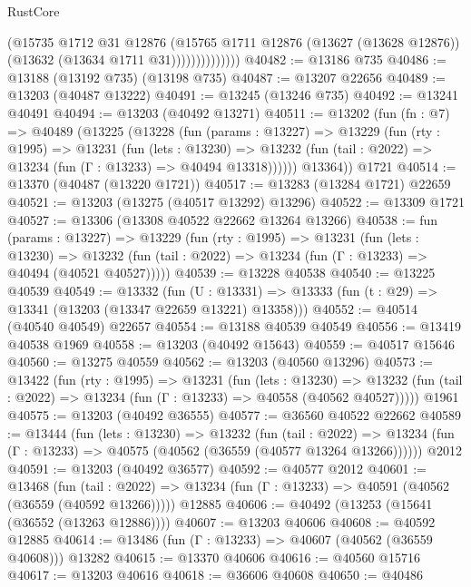 \begin{lexlean}{RustCore}
\begin{coremodule}
                        (@15735
                          @1712
                          @31
                          @12876
                          (@15765
                            @1711
                            @12876
                            (@13627 (@13628 @12876))
                            (@13632 (@13634 @1711 @31))))))))))))))
@40482 := @13186 @735
@40486 := @13188 (@13192 @735) (@13198 @735)
@40487 := @13207 @22656
@40489 := @13203 (@40487 @13222)
@40491 := @13245 (@13246 @735)
@40492 := @13241 @40491
@40494 := @13203 (@40492 @13271)
@40511 := @13202
    (fun (fn : @7) =>
    @40489
      (@13225
        (@13228
          (fun (params : @13227) =>
          @13229
            (fun (rty : @1995) =>
            @13231
              (fun (lets : @13230) =>
              @13232 (fun (tail : @2022) => @13234 (fun (Γ : @13233) => @40494 @13318))))))
        @13364))
    @1721
@40514 := @13370 (@40487 (@13220 @1721))
@40517 := @13283 (@13284 @1721) @22659
@40521 := @13203 (@13275 (@40517 @13292) @13296)
@40522 := @13309 @1721
@40527 := @13306 (@13308 @40522 @22662 @13264 @13266)
@40538 := fun (params : @13227) =>
  @13229
    (fun (rty : @1995) =>
    @13231
      (fun (lets : @13230) =>
      @13232 (fun (tail : @2022) => @13234 (fun (Γ : @13233) => @40494 (@40521 @40527)))))
@40539 := @13228 @40538
@40540 := @13225 @40539
@40549 := @13332
    (fun (U : @13331) => @13333 (fun (t : @29) => @13341 (@13203 (@13347 @22659 @13221) @13358)))
@40552 := @40514 (@40540 @40549) @22657
@40554 := @13188 @40539 @40549
@40556 := @13419 @40538 @1969
@40558 := @13203 (@40492 @15643)
@40559 := @40517 @15646
@40560 := @13275 @40559
@40562 := @13203 (@40560 @13296)
@40573 := @13422
    (fun (rty : @1995) =>
    @13231
      (fun (lets : @13230) =>
      @13232 (fun (tail : @2022) => @13234 (fun (Γ : @13233) => @40558 (@40562 @40527)))))
    @1961
@40575 := @13203 (@40492 @36555)
@40577 := @36560 @40522 @22662
@40589 := @13444
    (fun (lets : @13230) =>
    @13232
      (fun (tail : @2022) =>
      @13234 (fun (Γ : @13233) => @40575 (@40562 (@36559 (@40577 @13264 @13266))))))
    @2012
@40591 := @13203 (@40492 @36577)
@40592 := @40577 @2012
@40601 := @13468
    (fun (tail : @2022) => @13234 (fun (Γ : @13233) => @40591 (@40562 (@36559 (@40592 @13266)))))
    @12885
@40606 := @40492 (@13253 (@15641 (@36552 (@13263 @12886))))
@40607 := @13203 @40606
@40608 := @40592 @12885
@40614 := @13486 (fun (Γ : @13233) => @40607 (@40562 (@36559 @40608))) @13282
@40615 := @13370 @40606
@40616 := @40560 @15716
@40617 := @13203 @40616
@40618 := @36606 @40608
@40650 := @40486

\end{coremodule}
\end{lexlean}
